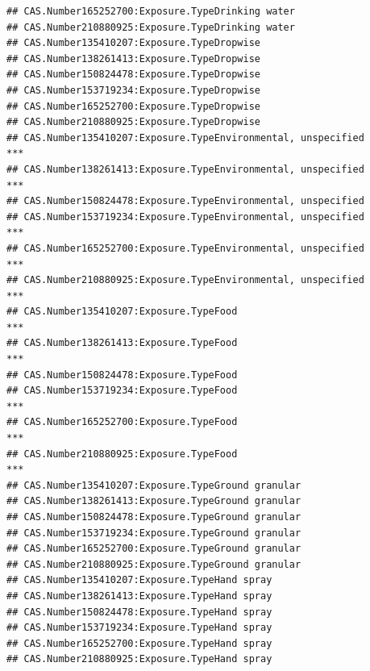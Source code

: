 \documentclass[
  12pt,
]{article}
\begin{document}
\begin{verbatim}
## CAS.Number165252700:Exposure.TypeDrinking water                                
## CAS.Number210880925:Exposure.TypeDrinking water                                
## CAS.Number135410207:Exposure.TypeDropwise                                      
## CAS.Number138261413:Exposure.TypeDropwise                                      
## CAS.Number150824478:Exposure.TypeDropwise                                      
## CAS.Number153719234:Exposure.TypeDropwise                                      
## CAS.Number165252700:Exposure.TypeDropwise                                      
## CAS.Number210880925:Exposure.TypeDropwise                                      
## CAS.Number135410207:Exposure.TypeEnvironmental, unspecified                 ***
## CAS.Number138261413:Exposure.TypeEnvironmental, unspecified                 ***
## CAS.Number150824478:Exposure.TypeEnvironmental, unspecified                    
## CAS.Number153719234:Exposure.TypeEnvironmental, unspecified                 ***
## CAS.Number165252700:Exposure.TypeEnvironmental, unspecified                 ***
## CAS.Number210880925:Exposure.TypeEnvironmental, unspecified                 ***
## CAS.Number135410207:Exposure.TypeFood                                       ***
## CAS.Number138261413:Exposure.TypeFood                                       ***
## CAS.Number150824478:Exposure.TypeFood                                          
## CAS.Number153719234:Exposure.TypeFood                                       ***
## CAS.Number165252700:Exposure.TypeFood                                       ***
## CAS.Number210880925:Exposure.TypeFood                                       ***
## CAS.Number135410207:Exposure.TypeGround granular                               
## CAS.Number138261413:Exposure.TypeGround granular                               
## CAS.Number150824478:Exposure.TypeGround granular                               
## CAS.Number153719234:Exposure.TypeGround granular                               
## CAS.Number165252700:Exposure.TypeGround granular                               
## CAS.Number210880925:Exposure.TypeGround granular                               
## CAS.Number135410207:Exposure.TypeHand spray                                    
## CAS.Number138261413:Exposure.TypeHand spray                                    
## CAS.Number150824478:Exposure.TypeHand spray                                    
## CAS.Number153719234:Exposure.TypeHand spray                                    
## CAS.Number165252700:Exposure.TypeHand spray                                    
## CAS.Number210880925:Exposure.TypeHand spray                                    

\end{verbatim}
\end{document}
